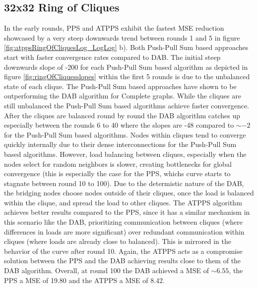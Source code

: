 \subsection{32x32 Ring of Cliques}\label{subsec:32_32ROC}
In the early rounds, PPS and ATPPS exhibit the fastest MSE reduction showcased by a very steep downwards trend between rounds 1 and 5 in figure \ref{fig:atppsRingOfCliquesLog_LogLog} b). Both Push-Pull Sum based approaches start with faster convergence rates compared to DAB. The initial steep downwards slope of -200 for each Push-Pull Sum based algorithm as depicted in figure \ref{fig:ringOfCliquesslopes} within the first 5 rounds is due to the unbalanced state of each clique. The Push-Pull Sum based approaches have shown to be outperforming the DAB algorithm for Complete graphs. While the cliques are still unbalanced the Push-Pull Sum based algorithms achieve faster convergence. After the cliques are balanced round by round the DAB algorithm catches up especially between the rounds 6 to 40 where the slopes are -48 compared to $\sim-2$ for the Push-Pull Sum based algorithms. Nodes within cliques tend to converge quickly internally due to their dense interconnections for the Push-Pull Sum based algorithms. However, load balancing between cliques, especially when the nodes select for random neighbors is slower, creating bottlenecks for global convergence (this is especially the case for the PPS, whichs curve starts to stagnate between round 10 to 100). Due to the determistic nature of the DAB, the bridging nodes choose nodes outside of their cliques, once the load is balanced within the clique, and spread the load to other cliques. The ATPPS algorithm achieves better results compared to the PPS, since it has a similar mechanism in this scenario like the DAB, prioritizing communication between cliques (where differences in loads are more significant) over redundant communication within cliques (where loads are already close to balanced). This is mirrored in the behavior of the curve after round 10. Again, the ATPPS acts as a compromise solution between the PPS and the DAB achieving results close to them of the DAB algorithm. Overall, at round 100 the DAB achieved a MSE of $\sim 6.55$, the PPS a MSE of 19.80 and the ATPPS a MSE of 8.42.

